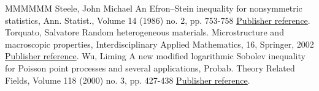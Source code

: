 \documentclass[11pt]{article}
\theoremstyle{definition}
\numberwithin{equation}{section}
\numberwithin{figure}{section}
\numberwithin{table}{section}
\begin{document}
\begin{thebibliography}{MMMMMM}
 Steele, John Michael An Efron–Stein inequality for nonsymmetric statistics, Ann. Statist., Volume 14 (1986) no. 2, pp. 753-758 \href{https://ahl.centre-mersenne.org/item/AHL_2020__3__825_0/#Steele-86}{Publisher reference}.
 Torquato, Salvatore Random heterogeneous materials. Microstructure and macroscopic properties, Interdisciplinary Applied Mathematics, 16, Springer, 2002 \href{https://ahl.centre-mersenne.org/item/AHL_2020__3__825_0/#Torquato-02}{Publisher reference}.
 Wu, Liming A new modified logarithmic Sobolev inequality for Poisson point processes and several applications, Probab. Theory Related Fields, Volume 118 (2000) no. 3, pp. 427-438 \href{https://ahl.centre-mersenne.org/item/AHL_2020__3__825_0/#Wu00}{Publisher reference}.
\end{thebibliography}
\end{document}
